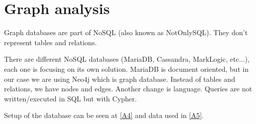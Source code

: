 \section{Graph analysis}\label{GraphAnalysis}
Graph databases are part of NoSQL (also known as NotOnlySQL). They don't represent tables and relations.

There are different NoSQL databases (MariaDB, Cassandra, MarkLogic, etc...), each one is focusing on its own solution. MariaDB is document oriented, but in our case we are using Neo4j \parencite{miller2013graph} which is graph database. Instead of tables and relations, we have nodes and edges. Another change is language. Queries are not written/executed in SQL but with Cypher.

Setup of the database can be seen at \ref{A4} and data used in \ref{A5}.
%

%


\newpage

\newpage

\newpage

\newpage